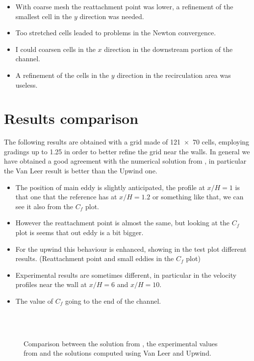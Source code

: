 \documentclass[11pt, a4paper]{article}
\theoremstyle{definition}
\begin{document}
\begin{itemize}
	\item With coarse mesh the reattachment point was lower, a refinement of 
	the smallest cell in the $y$ direction was needed.
	\item Too stretched cells leaded to problems in the Newton convergence.
	\item I could coarsen cells in the $x$ direction in the downstream portion 
	of the channel.
	\item A refinement of the cells in the $y$ direction in the recirculation 
	area was useless.
\end{itemize}
\section{Results comparison}
The following results are obtained with a grid made of \num{121 x 70} cells, 
employing gradings up to 1.25 in order to better refine the grid near the 
walls. In general we have obtained a good agreement with the numerical solution 
from \cite{sitonasa}, in particular the Van Leer result is better than the 
Upwind one.
\begin{itemize}
	\item The position of main eddy is slightly anticipated, the profile at 
	$x/H = 1$ is that one that the reference has at $x/H = 1.2$ or something 
	like that, we can see it also from the $C_f$ plot.
	\item However the reattachment point is almost the same, but looking at the 
	$C_f$ plot is seems that out eddy is a bit bigger.
	\item For the upwind this behaviour is enhanced, showing in the test plot 
	different results. (Reattachment point and small eddies in the $C_f$ plot)
	\item Experimental results are sometimes different, in particular in the 
	velocity profiles near the wall at $x/H=6$ and $x/H=10$.
	\item The value of $C_f$ going to the end of the channel.
\end{itemize}
\begin{figure}
	\centering
	\subfloat[Velocity profiles at $x/H = -4$]{}
	\subfloat[Velocity profiles at $x/H = 1$]{}\\
	\subfloat[Velocity profiles at $x/H = 4$]{}
	\subfloat[Velocity profiles at $x/H = 6$]{}\\
	\subfloat[Velocity profiles at $x/H = 10$]{}
	\caption{Comparison between the solution from \cite{sitonasa}, the 
	experimental values from \cite{driver} and the solutions computed using Van 
	Leer and Upwind.}
	\label{fig:bfs_fin}
\end{figure}
\end{document}
